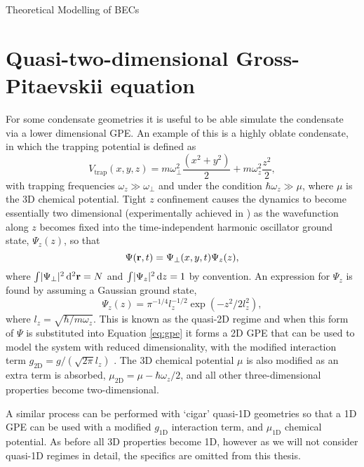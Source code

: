 \begin{chapter}{\label{cha:theoretical_model}Theoretical Modelling of BECs}
\section{\label{section:quasi2dgpe} Quasi-two-dimensional Gross-Pitaevskii equation}
	For some condensate geometries it is useful to be able simulate the condensate via a lower dimensional GPE. An example of this is a highly oblate condensate, in which the trapping potential is defined as
	\begin{equation}
		V_{\mathrm{trap}}(x,y,z)=m\omega_\perp^2\frac{\left ( x^2+y^2 \right )}{2} + m\omega_z^2\frac{z^2}{2},
	\end{equation}
	with trapping frequencies $\omega_z \gg \omega_\perp$ and under the condition $\hbar\omega_z \gg \mu$, where $\mu$ is the 3D chemical potential. Tight $z$ confinement causes the dynamics to become essentially two dimensional (experimentally achieved in \cite{Gorlitz}) as the wavefunction along $z$ becomes fixed into the time-independent harmonic oscillator ground state, $\Psi_z(z)$, so that
	\begin{equation}
		\Psi({\bf r},t) = \Psi_\perp(x,y,t) \Psi_z(z),
	\end{equation}
	where $\int\!|\Psi_\perp|^2\,{\rm d}^2{\bf r} = N$ and $\int\!|\Psi_z|^2\,{\rm d}z = 1$ by convention. An expression for $\Psi_z$ is found by assuming a Gaussian ground state,
	\begin{equation}
		\Psi_z(z) = \pi^{-1/4} l_z^{-1/2} \exp\left(-z^2/2l_z^2\right),
	\end{equation}
  where $l_z=\sqrt{\hbar/m \omega_z}$. This is known as the quasi-2D regime and when this form of $\Psi$ is substituted into Equation \ref{eq:gpe} it forms a 2D GPE that can be used to model the system with reduced dimensionality, with the modified interaction term $g_{\mathrm{2D}} = g/( \sqrt{2\pi}l_z)$ \cite{parkerthesis}. The 3D chemical potential $\mu$ is also modified as an extra term is absorbed, $\mu_\mathrm{2D} = \mu - \hbar\omega_z/2$, and all other three-dimensional properties become two-dimensional.

	A similar process can be performed with `cigar' quasi-1D geometries so that a 1D GPE can be used with a modified $g_{\mathrm{1D}}$ interaction term, and $\mu_{\mathrm{1D}}$ chemical potential. As before all 3D properties become 1D, however as we will not consider quasi-1D regimes in detail, the specifics are omitted from this thesis.


\end{chapter}
